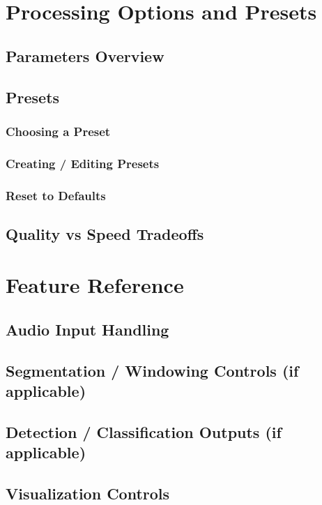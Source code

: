 \documentclass[11pt]{report}
\begin{document}
    \chapter{Processing Options and Presets}
    \section{Parameters Overview}
    \section{Presets}
    \subsection{Choosing a Preset}
    \subsection{Creating / Editing Presets}
    \subsection{Reset to Defaults}
    \section{Quality vs Speed Tradeoffs}
    
    \chapter{Feature Reference}
    \section{Audio Input Handling}
    \section{Segmentation / Windowing Controls (if applicable)}
    \section{Detection / Classification Outputs (if applicable)}
    \section{Visualization Controls}
\end{document}
